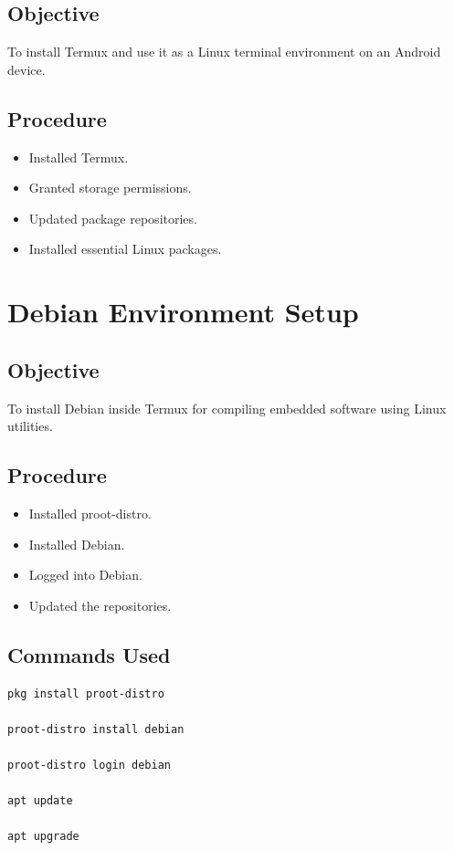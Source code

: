 \documentclass[12pt,a4paper]{report}
\begin{document}
\subsection{Objective}

To install Termux and use it as a Linux terminal environment on an Android device.

\subsection{Procedure}

\begin{itemize}
\item Installed Termux.
\item Granted storage permissions.
\item Updated package repositories.
\item Installed essential Linux packages.
\end{itemize}


\section{Debian Environment Setup}

\subsection{Objective}

To install Debian inside Termux for compiling embedded software using Linux utilities.

\subsection{Procedure}

\begin{itemize}
\item Installed proot-distro.
\item Installed Debian.
\item Logged into Debian.
\item Updated the repositories.
\end{itemize}

\subsection{Commands Used}

\begin{lstlisting}[language=bash]
pkg install proot-distro

proot-distro install debian

proot-distro login debian

apt update

apt upgrade
\end{lstlisting}
\end{document}
